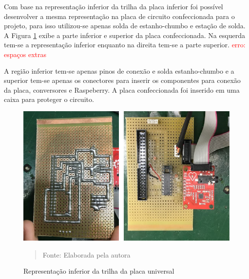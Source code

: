 \documentclass[12pt, a4paper]{article}
\begin{document}
Com base na representação inferior da trilha da placa inferior foi possível desenvolver a mesma representação na placa de circuito confeccionada para o projeto, para isso utilizou-se apenas solda de estanho-chumbo  e estação de solda. A Figura \ref{fig:trilhainfesup} exibe a parte inferior e superior da placa confeccionada. Na esquerda tem-se a representação inferior enquanto na direita tem-se a parte superior. \textcolor{red}{erro: espaços extras}


A região inferior tem-se apenas pinos de conexão e solda estanho-chumbo e a superior tem-se apenas os conectores para inserir os componentes para conexão da placa, conversores e Raspeberry. A placa confeccionada foi inserido em uma caixa para proteger o circuito.

\begin{figure}[H]
\begin{center}
			\caption{Representação inferior da trilha da placa universal}
			\includegraphics[width=.9\textwidth]{Figuras/pl.PNG}
             \vspace*{\fill} 
            \begin{quote} 
            \centering 
         Fonte: Elaborada pela autora
            \end{quote}
            \vspace*{\fill}
			\label{fig:trilhainfesup}
\end{center}
\end{figure}
\end{document}
